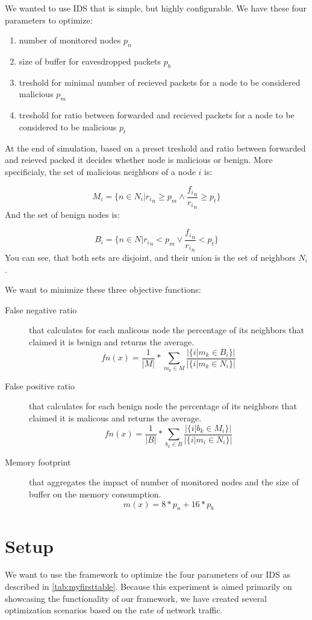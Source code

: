 \documentclass[12pt,oneside]{fithesis2}
\begin{document}
We wanted to use IDS that is simple, but highly configurable. 
We have these four parameters to optimize:
\begin{enumerate}
\item number of monitored nodes $p_n$
\item size of buffer for eavesdropped packets $p_b$
\item treshold for minimal number of recieved packets for a node to be considered malicious $p_m$
\item treshold for ratio between forwarded and recieved packets for a node to be considered to be malicious $p_t$
\end{enumerate}

At the end of simulation, based on a preset treshold and ratio between forwarded and reieved packed it decides whether node is malicious or benign. More specificialy, the set of malicious neighbors of a node $i$ is:

$$ M_i = \{n \in N_i|{r_i}_n \geq p_m \land \frac{{f_i}_n}{{r_i}_n} \geq p_t \} $$
And the set of benign nodes is:

$$B_i = \{n \in N|{r_i}_n < p_m \lor \frac{{f_i}_n}{{r_i}_n} < p_t \} $$
You can see, that both sets are disjoint, and their union is the set of neighbors $N_i$. 

We want to minimize these three objective functions:
\begin{description}
\item[False negative ratio] that calculates for each malicous node the percentage of its neighbors that claimed it is benign and returns the average.
$$fn(x) = \frac{1}{|M|}* \sum\limits_{m_k\in M} \frac{|\{i|m_k \in B_i\}|}{|\{i|m_k \in N_i\}|} $$
\item[False positive ratio] that calculates for each benign node the percentage of its neighbors that claimed it is malicous and returns the average.
$$fn(x) = \frac{1}{|B|}* \sum\limits_{b_k\in B} \frac{|\{i|b_k \in M_i\}|}{|\{i|m_i \in N_i\}|} $$
\item[Memory footprint] that aggregates the impact of number of monitored nodes and the size of buffer on the memory consumption.
$$m(x) = 8*p_n + 16*p_b $$
\end{description}

\section{Setup}
We want to use the framework to optimize the four parameters of our IDS as described in \ref{tab:myfirsttable}. 
Because this experiment is aimed primarily on showcasing the functionality of our framework, we have created several optimization scenarios based on the rate of network traffic.
\end{document}
